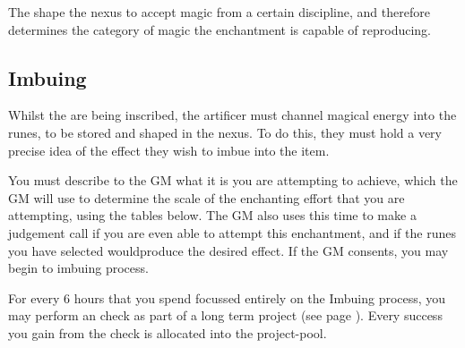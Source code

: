 {
	The  shape the nexus to accept magic from a certain discipline, and therefore determines the category of magic the enchantment is capable of reproducing.
}
{
	
	
	
	
	
	
	
	
	
	
	
	
	
} 





\subsection{Imbuing}

Whilst the  are being inscribed, the artificer must channel magical energy into the runes, to be stored and shaped in the nexus. To do this, they must hold a very precise idea of the effect they wish to imbue into the item. 

You must describe to the GM what it is you are attempting to achieve, which the GM will use to determine the scale of the enchanting effort that you are attempting, using the tables below. The GM also uses this time to make a judgement call if you are even able to attempt this enchantment, and if the runes you have selected wouldproduce the desired effect. If the GM consents, you may begin to imbuing process. 

For every 6 hours that you spend focussed entirely on the Imbuing process, you may perform an  check as part of a long term project (see page \pageref{S:Extended}). Every success you gain from the check is allocated into the project-pool. 

